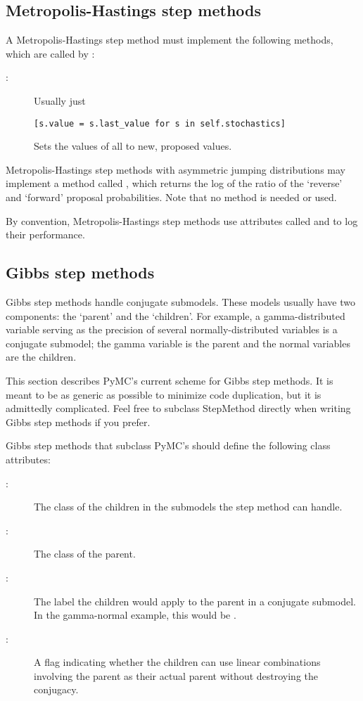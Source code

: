\subsection*{Metropolis-Hastings step methods} \label{user-metro}
A Metropolis-Hastings step method must implement the following methods, which are called by :
\begin{description}

   \item[:] Usually just
   \begin{verbatim}
[s.value = s.last_value for s in self.stochastics]
   \end{verbatim}
   \item[] Sets the values of all  to new, proposed values.
\end{description}
Metropolis-Hastings step methods with asymmetric jumping distributions may implement a method called , which returns the log of the ratio of the `reverse' and `forward' proposal probabilities. Note that no  method is needed or used.

By convention, Metropolis-Hastings step methods use attributes called  and  to log their performance.

\hypertarget{user-gibbs}{}
\subsection*{Gibbs step methods} \label{user-gibbs}

Gibbs step methods handle conjugate submodels. These models usually have two components: the `parent' and the `children'. For example, a gamma-distributed variable serving as the precision of several normally-distributed variables is a conjugate submodel; the gamma variable is the parent and the normal variables are the children. 

This section describes PyMC's current scheme for Gibbs step methods. It is meant to be as generic as possible to minimize code duplication, but it is admittedly complicated. Feel free to subclass StepMethod directly when writing Gibbs step methods if you prefer.

Gibbs step methods that subclass PyMC's  should define the following class attributes:
\begin{description}
   \item[:] The class of the children in the submodels the step method can handle.
   \item[:] The class of the parent.
   \item[:] The label the children would apply to the parent in a conjugate submodel. In the gamma-normal example, this would be .
   \item[:] A flag indicating whether the children can use linear combinations involving the parent as their actual parent without destroying the conjugacy.
\end{description}

